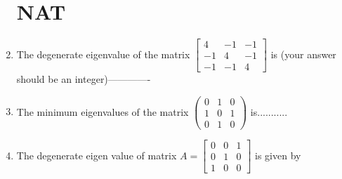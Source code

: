 \begin{enumerate}
\section{NAT}              
  \item The degenerate eigenvalue of the matrix $\left[\begin{array}{ccc}4 & -1 & -1 \\ -1 & 4 & -1 \\ -1 & -1 & 4\end{array}\right]$ is (your answer should be an integer)-------------      
\item  The minimum eigenvalues of the matrix $\left(\begin{array}{lll}0 & 1 & 0 \\ 1 & 0 & 1 \\ 0 & 1 & 0\end{array}\right)$ is...........               
  \item The degenerate eigen value of matrix $A=\left[\begin{array}{lll}0 & 0 & 1 \\ 0 & 1 & 0 \\ 1 & 0 & 0\end{array}\right]$ is given by
                
                
                
\end{enumerate}